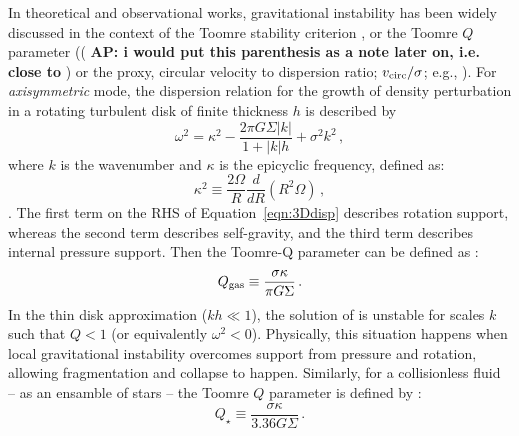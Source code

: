 \IfFileExists{emulateapjlegacy.cls}{\documentclass[iop]{emulateapjlegacy}}{\documentclass[iop]{emulateapj}}
\newcommand{\AP}[1]{({\bf \color{apcolor} AP: #1})}
\begin{document}
In theoretical and observational works, gravitational instability has been widely discussed in the context of the Toomre stability criterion \citep{Toomre64a, Goldreich65b}, or the Toomre $Q$ parameter (\AP{i would put this parenthesis as a note later on, i.e. close to \Eq{q_eff}} or the proxy, circular velocity to dispersion ratio; $v_{\rm circ}/\sigma$; e.g., \citealt{GarciaBurillo03a, Genzel11a, Kassin12a, Leung19a}).
%
For {\it axisymmetric} mode, the dispersion relation for the growth of density perturbation in a rotating turbulent disk of 
finite thickness $h$ is described by 
\begin{equation}
\omega^2 = \kappa^2 - \frac{2\pi G \Sigma |k|}{1 + |k| h} + \sigma^2 k^2\,,
\label{eqn:3Ddisp}
\end{equation}
where $k$ is the wavenumber and $\kappa$ is the epicyclic frequency, defined as:
\begin{equation}
\kappa^2\equiv\frac{2\Omega}{R}\frac{d}{dR}\left(R^2\Omega\right)\,,
\label{eqn:kappa}
\end{equation}
\citep{Romeo92a}.
The first term on the RHS of Equation~\ref{eqn:3Ddisp} describes rotation support, whereas the second term describes self-gravity, and the third term describes internal pressure support. Then the Toomre-Q parameter can be defined as \citep{Toomre64a}:
\begin{equation}
Q_{\rm gas}\equiv\frac{\sigma\kappa}{\pi G \Sigma}\,.
\label{eqn:Q}
\end{equation}
In the thin disk approximation ($kh\ll1$), the solution of  is unstable for scales $k$ such that $Q < 1$ (or equivalently $\omega^2 < 0$). Physically, this situation happens when local gravitational instability 
overcomes support from pressure and rotation, allowing fragmentation and collapse to happen.
Similarly, for a collisionless fluid -- as an ensamble of stars -- the Toomre $Q$ parameter is defined by \citep{Toomre64a}:
\begin{equation}
Q_{\star} \equiv\frac{\sigma\kappa}{3.36 G \Sigma}\,.
\end{equation}
\end{document}
